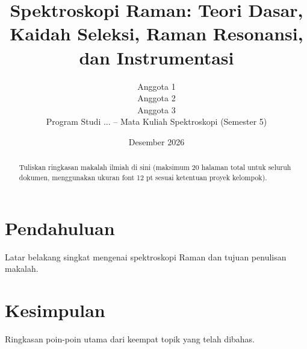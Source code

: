 \documentclass[12pt,a4paper]{article}
\title{\textbf{Spektroskopi Raman: Teori Dasar, Kaidah Seleksi, Raman Resonansi, dan Instrumentasi}}
\author{
  Anggota 1 \\
  Anggota 2 \\
  Anggota 3 \\
  \small Program Studi ... -- Mata Kuliah Spektroskopi (Semester 5)
}
\date{Desember 2026}
\begin{document}
\maketitle

\begin{abstract}
Tuliskan ringkasan makalah ilmiah di sini (maksimum 20 halaman total untuk seluruh dokumen, menggunakan ukuran font 12 pt sesuai ketentuan proyek kelompok).
\end{abstract}

\section{Pendahuluan}
Latar belakang singkat mengenai spektroskopi Raman dan tujuan penulisan makalah.






\section{Kesimpulan}
Ringkasan poin-poin utama dari keempat topik yang telah dibahas.



\end{document}
